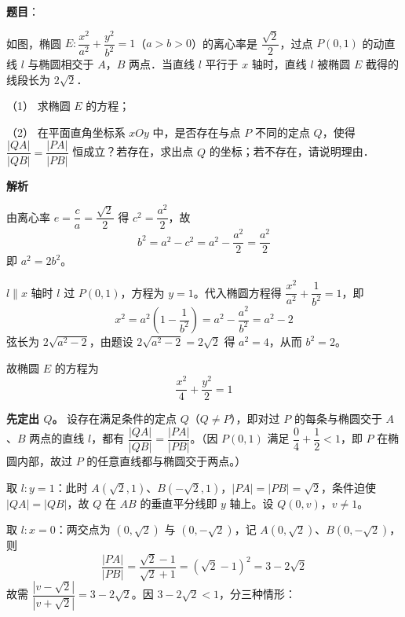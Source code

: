 \begin{answer}

\textbf{题目}：

如图，椭圆 \(E:\dfrac{x^2}{a^2}+\dfrac{y^2}{b^2}=1\)（\(a>b>0\)）的离心率是 \(\dfrac{\sqrt{2}}{2}\)，过点 \(P(0,1)\) 的动直线 \(l\) 与椭圆相交于 \(A\)，\(B\) 两点．当直线 \(l\) 平行于 \(x\) 轴时，直线 \(l\) 被椭圆 \(E\) 截得的线段长为 \(2\sqrt{2}\)．
\nopagebreak[4]
\begin{center}\end{center}
\nopagebreak[4]
（1） 求椭圆 \(E\) 的方程；

（2） 在平面直角坐标系 \(xOy\) 中，是否存在与点 \(P\) 不同的定点 \(Q\)，使得 \(\dfrac{|QA|}{|QB|}=\dfrac{|PA|}{|PB|}\) 恒成立？若存在，求出点 \(Q\) 的坐标；若不存在，请说明理由．

\textbf{解析}


由离心率 \(e=\dfrac ca=\dfrac{\sqrt2}2\) 得 \(c^{2}=\dfrac{a^{2}}2\)，故
\nopagebreak[4]
\[b^{2}=a^{2}-c^{2}=a^{2}-\dfrac{a^{2}}2=\dfrac{a^{2}}2\]
即 \(a^{2}=2b^{2}\)。

\(l\parallel x\) 轴时 \(l\) 过 \(P(0,1)\)，方程为 \(y=1\)。代入椭圆方程得 \(\dfrac{x^{2}}{a^{2}}+\dfrac1{b^{2}}=1\)，即
\nopagebreak[4]
\[x^{2}=a^{2}\left(1-\dfrac1{b^{2}}\right)=a^{2}-\dfrac{a^{2}}{b^{2}}=a^{2}-2\]
弦长为 \(2\sqrt{a^{2}-2}\)，由题设 \(2\sqrt{a^{2}-2}=2\sqrt2\) 得 \(a^{2}=4\)，从而 \(b^{2}=2\)。

故椭圆 \(E\) 的方程为
\nopagebreak[4]
\[\dfrac{x^{2}}4+\dfrac{y^{2}}2=1\]


\textbf{先定出 \(Q\)。} 设存在满足条件的定点 \(Q\)（\(Q\neq P\)），即对过 \(P\) 的每条与椭圆交于 \(A\)、\(B\) 两点的直线 \(l\)，都有 \(\dfrac{|QA|}{|QB|}=\dfrac{|PA|}{|PB|}\)。（因 \(P(0,1)\) 满足 \(\dfrac{0}{4}+\dfrac12<1\)，即 \(P\) 在椭圆内部，故过 \(P\) 的任意直线都与椭圆交于两点。）

取 \(l:y=1\)：此时 \(A(\sqrt2,1)\)、\(B(-\sqrt2,1)\)，\(|PA|=|PB|=\sqrt2\)，条件迫使 \(|QA|=|QB|\)，故 \(Q\) 在 \(AB\) 的垂直平分线即 \(y\) 轴上。设 \(Q(0,v)\)，\(v\neq1\)。

取 \(l:x=0\)：两交点为 \((0,\sqrt2)\) 与 \((0,-\sqrt2)\)，记 \(A(0,\sqrt2)\)、\(B(0,-\sqrt2)\)，则
\nopagebreak[4]
\[\dfrac{|PA|}{|PB|}=\dfrac{\sqrt2-1}{\sqrt2+1}=\left(\sqrt2-1\right)^{2}=3-2\sqrt2\]
故需 \(\dfrac{|v-\sqrt2|}{|v+\sqrt2|}=3-2\sqrt2\)。因 \(3-2\sqrt2<1\)，分三种情形：


\end{answer}
